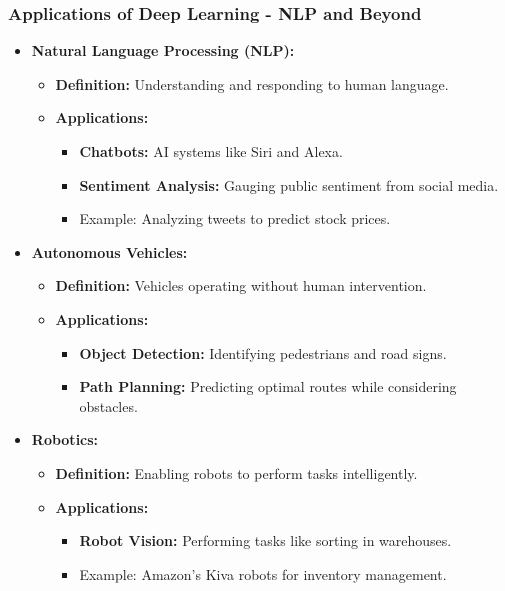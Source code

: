 \documentclass{beamer}
\begin{document}
\begin{frame}[fragile]
    \frametitle{Applications of Deep Learning - NLP and Beyond}
    \begin{itemize}
        \item \textbf{Natural Language Processing (NLP):}
        \begin{itemize}
            \item \textbf{Definition:} Understanding and responding to human language.
            \item \textbf{Applications:}
                \begin{itemize}
                    \item \textbf{Chatbots:} AI systems like Siri and Alexa.
                    \item \textbf{Sentiment Analysis:} Gauging public sentiment from social media.
                    \item Example: Analyzing tweets to predict stock prices.
                \end{itemize}
        \end{itemize}

        \item \textbf{Autonomous Vehicles:}
        \begin{itemize}
            \item \textbf{Definition:} Vehicles operating without human intervention.
            \item \textbf{Applications:}
                \begin{itemize}
                    \item \textbf{Object Detection:} Identifying pedestrians and road signs.
                    \item \textbf{Path Planning:} Predicting optimal routes while considering obstacles.
                \end{itemize}
        \end{itemize}
        
        \item \textbf{Robotics:}
        \begin{itemize}
            \item \textbf{Definition:} Enabling robots to perform tasks intelligently.
            \item \textbf{Applications:}
                \begin{itemize}
                    \item \textbf{Robot Vision:} Performing tasks like sorting in warehouses.
                    \item Example: Amazon’s Kiva robots for inventory management.
                \end{itemize}
        \end{itemize}
    \end{itemize}
\end{frame}
\end{document}

